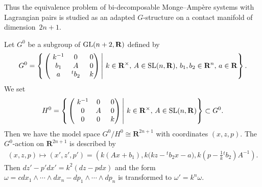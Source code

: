 \documentclass[11pt]{article}
\begin{document}
Thus the equivalence problem of bi-decomposable Monge--Amp{\`e}re systems with Lagrangian pairs
is studied as an adapted $G$-structure on a contact manifold of dimension~$2n+1$.

Let $G^0$ be a subgroup of ${\rm GL}(n+2, {\mathbf{R}})$ def\/ined by
\begin{gather*}
G^0 = \left\{ \left.
\begin{pmatrix}
                      \ k^{-1} & 0 & \ 0 \\
                      \ b_1 & A & \ 0 \\
                      \ a & {}^tb_2 &  \ k
                    \end{pmatrix}
                   \,  \right\vert \,
                    k \in {\mathbf{R}}^{\times}, \, A \in  {\rm SL}(n, {\mathbf{R}}), \, b_1, b_2 \in {\mathbf{R}}^n, \, a \in {\mathbf{R}}
                    \right\}.
\end{gather*}
We set
\begin{gather*}
H^0 = \left\{ \left.
\begin{pmatrix}
                      \ k^{-1} & 0 & \ 0 \\
                      \ 0 & A & \ 0 \\
                      \ 0 & 0 &  \ k
                              \end{pmatrix}
         \,  \right\vert   \,
        k \in {\mathbf{R}}^{\times}, \, A \in  {\rm SL} (n, {\mathbf{R}})
 \right\}
\subset G^0.
\end{gather*}
Then we have the model space
$G^0/H^0 \cong {\mathbf{R}}^{2n+1}$ with coordinates
$(x, z, p)$.
The $G^0$-action on ${\mathbf{R}}^{2n+1}$ is described by
\begin{gather*}
(x, z, p) \mapsto (x', z', p') = \left(k(Ax + b_1), k\big(kz - {}^tb_2x - a\big), k\left(p - \frac{1}{k}{}^tb_2\right)A^{-1}\right).
\end{gather*}
Then $dz' - p'dx' = k^2(dz - pdx)$ and
the form $\omega = c dx_1\wedge \cdots\wedge dx_n - dp_1\wedge\cdots\wedge dp_n$
is transformed to $\omega' = k^n\omega$.
\end{document}
